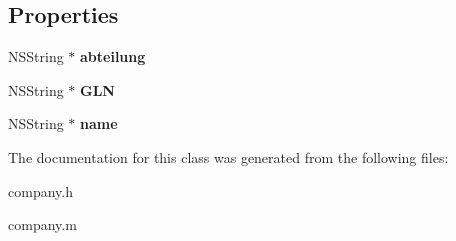 \subsection*{Properties}
\begin{DoxyCompactItemize}
\item 
\hypertarget{interfacecompany_a8d1487b3a6fab1272fd12d94cdd1c962}{}N\+S\+String $\ast$ {\bfseries abteilung}\label{interfacecompany_a8d1487b3a6fab1272fd12d94cdd1c962}

\item 
\hypertarget{interfacecompany_aec267e2e6fd275266b6c2f2a5619a1d7}{}N\+S\+String $\ast$ {\bfseries G\+L\+N}\label{interfacecompany_aec267e2e6fd275266b6c2f2a5619a1d7}

\item 
\hypertarget{interfacecompany_ac9bec50a47e6b4e1360832bde2a8423d}{}N\+S\+String $\ast$ {\bfseries name}\label{interfacecompany_ac9bec50a47e6b4e1360832bde2a8423d}

\end{DoxyCompactItemize}


The documentation for this class was generated from the following files\+:\begin{DoxyCompactItemize}
\item 
company.\+h\item 
company.\+m\end{DoxyCompactItemize}
